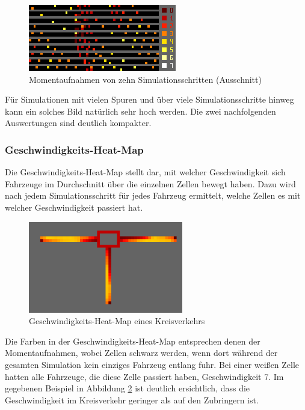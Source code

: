 \documentclass[10pt, a4paper]{article}
\begin{document}
\begin{figure}[h!]
	\centering
	\includegraphics[height=2.91cm]{img/vis_multilane_2_lanes}
	\caption{Momentaufnahmen von zehn Simulationsschritten (Ausschnitt)}
	\label{fig:momentaufnameMultilane}
\end{figure}

Für Simulationen mit vielen Spuren und über viele Simulationsschritte hinweg kann ein solches Bild natürlich sehr hoch werden. Die zwei nachfolgenden Auswertungen sind deutlich kompakter.

\subsubsection{Geschwindigkeits-Heat-Map}
\label{subsubsec:speedmap}

Die Geschwindigkeits-Heat-Map stellt dar, mit welcher Geschwindigkeit sich Fahrzeuge im Durchschnitt über die einzelnen Zellen bewegt haben. Dazu wird nach jedem Simulationsschritt für jedes Fahrzeug ermittelt, welche Zellen es mit welcher Geschwindigkeit passiert hat.

\begin{figure}[h!]
	\centering
	\includegraphics[height=4cm]{img/vis_roundabout_speed_heat_map}
	\caption{Geschwindigkeits-Heat-Map eines Kreisverkehrs}
	\label{fig:speedMapRoundabout}
\end{figure}

Die Farben in der Geschwindigkeits-Heat-Map entsprechen denen der Momentaufnahmen, wobei Zellen schwarz werden, wenn dort während der gesamten Simulation kein einziges Fahrzeug entlang fuhr. Bei einer weißen Zelle hatten alle Fahrzeuge, die diese Zelle passiert haben, Geschwindigkeit 7. Im gegebenen Beispiel in Abbildung \ref{fig:speedMapRoundabout} ist deutlich ersichtlich, dass die Geschwindigkeit im Kreisverkehr geringer als auf den Zubringern ist.
\end{document}
